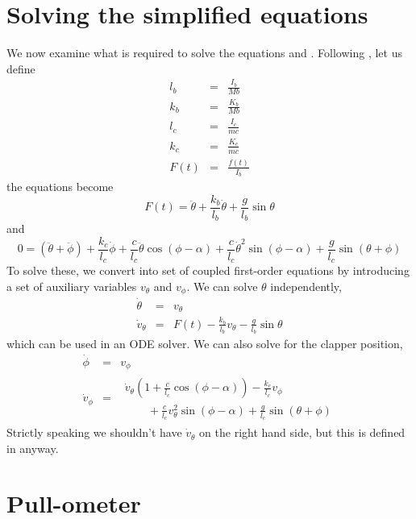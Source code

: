 \documentclass{article}
\begin{document}
\section{Solving the simplified equations}

We now examine what is required to solve the equations 
and . Following \cite{king94}, let us define
\begin{eqnarray}
l_b &=& \frac{I_b}{Mb} \\
k_b &=& \frac{K_b}{Mb} \\
l_c &=& \frac{I_c}{mc} \\
k_c &=& \frac{K_c}{mc} \\
F(t) &=& \frac{f(t)}{I_b}
\end{eqnarray}
the equations become
\begin{equation}
F(t) = \ddot{\theta} + \frac{k_b}{l_b}\dot{\theta} + \frac{g}{l_b}\sin \theta
\end{equation}
and
\begin{equation}
0=(\ddot{\theta} + \ddot{\phi}) + \frac{k_c}{l_c} \dot{\phi} 
+ \frac{c}{l_c}\ddot{\theta}\cos(\phi-\alpha)
+ \frac{c}{l_c}\dot{\theta}^2 \sin(\phi-\alpha) + \frac{g}{l_c}\sin(\theta+\phi)
\end{equation}
To solve these, we convert into set of coupled first-order equations by introducing
a set of auxiliary variables $v_\theta$ and $v_\phi$. We can solve $\theta$ independently,
\begin{eqnarray}
\dot{\theta} &=& v_\theta \label{eq:dtheta} \\
\dot{v}_\theta &=& F(t) - \frac{k_b}{l_b} v_\theta - \frac{g}{l_b} \sin \theta
\label{eq:vtheta}
\end{eqnarray}
which can be used in an ODE solver.
We can also solve for the clapper position,
\begin{eqnarray}
\dot{\phi} &=& v_\phi \\
\dot{v}_\phi &=& \begin{array}{c}
\dot{v}_\theta \left( 1 + \frac{c}{l_c}\cos(\phi - \alpha) \right) 
- \frac{k_c}{l_c}v_\phi \\
\quad \quad + \frac{c}{l_c} v_\theta^2 \sin(\phi - \alpha) 
+ \frac{g}{l_c}\sin(\theta + \phi)
\end{array}
\end{eqnarray}
Strictly speaking we shouldn't have $\dot{v}_\theta$ on the right hand side, but this is defined
in  anyway.

\section{Pull-ometer}
\end{document}
